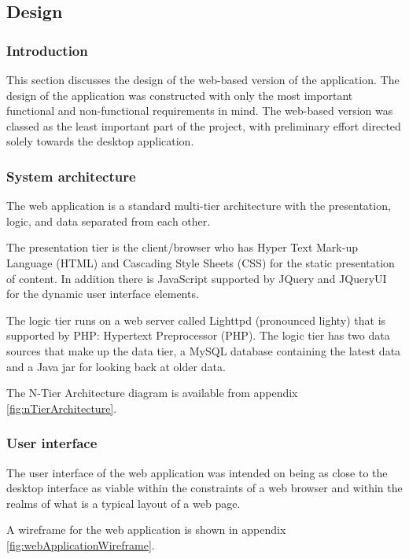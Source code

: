 \subsection{Design}

\subsubsection{Introduction}

This section discusses the design of the web-based version of the application.
The design of the application was constructed with only the most important
functional and non-functional requirements in mind. The web-based version was
classed as the least important part of the project, with preliminary effort
directed solely towards the desktop application.

\subsubsection{System architecture}

The web application is a standard multi-tier architecture with the presentation,
logic, and data separated from each other.

The presentation tier is the client/browser who has Hyper Text Mark-up Language
(HTML) and Cascading Style Sheets (CSS) for the static presentation of content.
In addition there is JavaScript supported by JQuery and JQueryUI for the dynamic
user interface elements.

The logic tier runs on a web server called Lighttpd (pronounced lighty) that is
supported by PHP: Hypertext Preprocessor (PHP). The logic tier has two data
sources that make up the data tier, a MySQL database containing the latest data
and a Java jar for looking back at older data.

The N-Tier Architecture diagram is available from appendix
\ref{fig:nTierArchitecture}.

\subsubsection{User interface}

The user interface of the web application was intended on being as close to the
desktop interface as viable within the constraints of a web browser and within
the realms of what is a typical layout of a web page.

A wireframe for the web application is shown in appendix
\ref{fig:webApplicationWireframe}.

